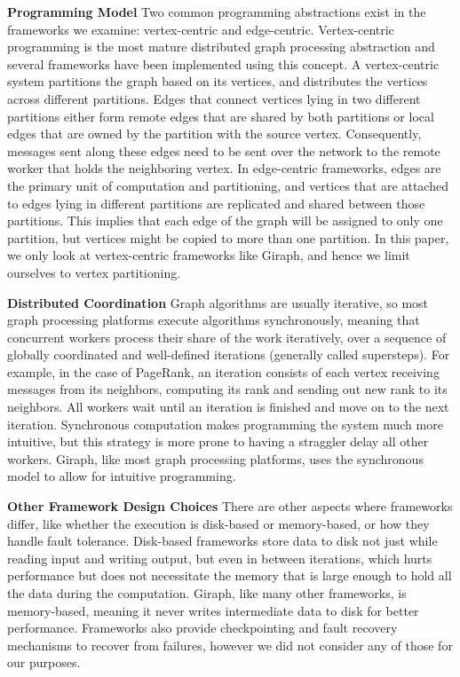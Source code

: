 \textbf{Programming Model}
Two common programming abstractions exist in the frameworks we examine: 
vertex-centric and edge-centric. Vertex-centric programming is the most mature 
distributed 
graph processing abstraction and several frameworks have been implemented using this concept.
A vertex-centric system partitions the graph based on its vertices, and distributes the 
vertices across different partitions. Edges that connect vertices lying in two different 
partitions either form remote edges that are shared by both partitions or local 
edges that are owned by the partition 
with the source vertex. Consequently, messages sent along these edges need to 
be sent over the network to the remote worker that holds the neighboring 
vertex. In edge-centric frameworks, edges are the primary unit of computation 
and partitioning, and vertices that are attached to edges lying in 
different partitions are replicated and shared between those partitions. This 
implies that each 
edge of the graph will be assigned to only one partition, but vertices might be 
copied to more than one partition. In this paper, we only look at 
vertex-centric frameworks like Giraph,
and hence we limit ourselves to vertex partitioning.

\textbf{Distributed Coordination}
Graph algorithms are usually iterative, so most graph processing platforms execute 
algorithms synchronously, meaning that concurrent workers process their share of the work 
iteratively, over a sequence of globally coordinated and well-defined iterations (generally called 
supersteps). For example, in the case of PageRank, an iteration consists of 
each vertex receiving messages
from its neighbors, computing its rank and sending out new rank to its neighbors. All workers 
wait until an iteration is finished and move on to the next iteration. 
Synchronous computation makes programming the system
much more intuitive, but this strategy is more prone to having a straggler  
delay all other workers. Giraph, like most graph processing platforms, uses 
the synchronous model to allow for intuitive programming. 

\textbf{Other Framework Design Choices} 
There are other aspects where frameworks differ, like whether the execution is disk-based or 
memory-based, or how they handle fault tolerance. Disk-based frameworks store data to disk not 
just while reading input and writing output, but even in between iterations, which hurts 
performance but does not necessitate the memory that is large enough to hold all the data 
during the computation. Giraph, like many other frameworks, is memory-based, meaning it never
writes intermediate data to disk for better performance. Frameworks also 
provide checkpointing
and fault recovery mechanisms to recover from failures, however we did not consider any of those 
for our purposes.













